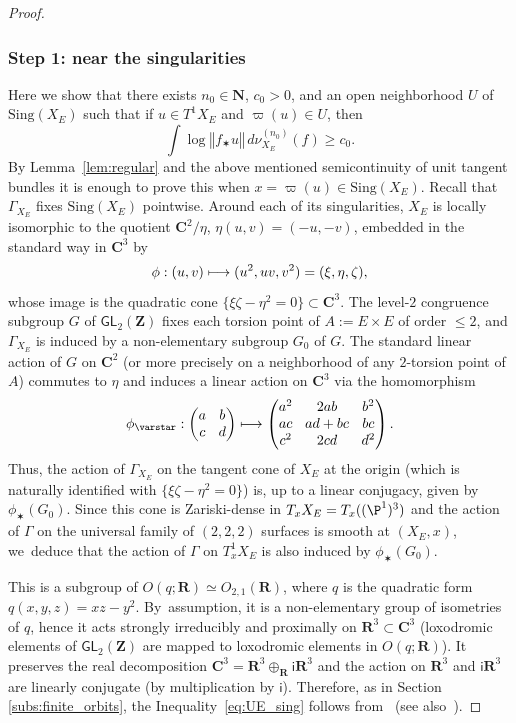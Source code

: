 \documentclass[JEP,XML,SOM,Unicode,published]{cedram}
\newcommand\mto{\mathchoice{\longmapsto}{\mapsto}{\mapsto}{\mapsto}}
\newcommand{\norm}[1]{{\left\Vert#1\right\Vert}}
\def\C{\mathbf{C}}
\def\R{\mathbf{R}}
\def\Z{\mathbf{Z}}
\def\N{\mathbf{N}}
\newcommand{\Sing}{{\mathrm{Sing}}}
\newcommand\ii{{\mathsf{i}}}
\newcommand\GL{{\mathsf{GL}}}
\theoremstyle{plain}
\theoremstyle{definition}
\begin{document}
\begin{proof}
\subsubsection*{Step 1: near the singularities}
Here we show that there exists $n_0\in \N$, $c_0>0$,
and an open neighborhood $U$ of $\Sing (X_E)$ such that if $u\in T^1X_E$ and
$\varpi(u)\in U$, then
\begin{equation}\label{eq:UE_sing}
\int \log\norm{f_\varstar u}\, d\nu_{X_E}^{(n_0)}(f) \geq c_0.
\end{equation}
By Lemma~\ref{lem:regular} and the above mentioned semicontinuity of unit tangent
bundles it is enough to prove this when
$x=\varpi(u)\in \Sing(X_E)$.
Recall that $\Gamma_{X_E}$ fixes $\Sing(X_E)$ pointwise. Around each of its singularities, $X_E$ is locally isomorphic to the quotient
$\C^2/\eta$, $\eta(u,v)=(-u,-v)$, embedded in the standard way in $\C^3$ by
\begin{equation*}
\phi: (u,v)\mto (u^2, uv, v^2) = (\xi,\eta,\zeta),
\end{equation*}
whose image is the quadratic cone $\{\xi\zeta-\eta^2 = 0\}\subset \C^3$. The level-$2$ congruence
subgroup $G$ of $\GL_2(\Z)$
fixes each torsion point of $A:=E\times E$ of order $\leq 2$, and $\Gamma_{X_E}$ is induced by
a non-elementary subgroup $G_0$ of $G$.
The standard linear action of $G$ on $\C^2$ (or more precisely on a neighborhood of any $2$-torsion point of $A$) commutes to $\eta$ and induces a linear action on $\C^3$ via the homomorphism
\begin{equation*}\arraycolsep4.5pt
\phi_\varstar: \begin{pmatrix} a&b\\ c&d\end{pmatrix} \longmapsto
\begin{pmatrix} a^2 & 2ab &b ^2 \\ ac & ad+bc & bc \\ c^2 & 2cd & d^2\end{pmatrix}.
\end{equation*}
Thus, the action of $\Gamma_{X_E}$ on the tangent cone
of $X_E$ at the origin (which is naturally identified with $\{\xi\zeta-\eta^2 = 0\}$)
is, up to a linear conjugacy, given by $\phi_\varstar(G_0)$. Since this cone is Zariski-dense in
$T_xX_E = T_x((\P^1)^3)$ and the action of $\Gamma$ on the universal family of $(2,2,2)$ surfaces is smooth at $(X_E, x)$, we~deduce that the action of $\Gamma$ on $T^1_xX_E$ is also induced
by $\phi_\varstar(G_0)$.

This is a subgroup
of $O(q;\R)\simeq O_{2,1}(\R)$, where $q$ is the quadratic form $q(x,y,z) = xz-y^2$. By~assumption, it is a non-elementary group of isometries of $q$, hence it acts strongly irreducibly and proximally on $\R^3\subset \C^3$ (loxodromic elements of $\GL_2(\Z)$ are mapped to loxodromic elements in $O(q;\R)$). It preserves the real decomposition $ \C^3=\R^3\oplus_\R \ii \R^3$ and the action on $\R^3$ and $\ii \R^3$ are linearly conjugate (by multiplication by $\ii$). Therefore, as in Section \ref{subs:finite_orbits}, the Inequality~\eqref{eq:UE_sing} follows from~\cite{furstenberg-kifer} (see also~\cite[Chap.\,III, Cor.\,3.4(iii)]{bougerol-lacroix}).


\end{proof}
\end{document}
